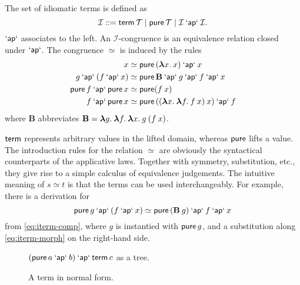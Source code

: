 \begin{definition}
The set of idiomatic terms is defined as
\begin{equation}
	\mathcal{I} ::= \operatorname{\mathsf{term}} \mathcal{T} \mid \operatorname{\mathsf{pure}} \mathcal{T} \mid
		\mathcal{I} \mathbin{\mathsf{`ap`}} \mathcal{I}.
\end{equation}
$\mathbin{\mathsf{`ap`}}$ associates to the left.
An $\mathcal{I}$-congruence is an equivalence relation closed under $\mathbin{\mathsf{`ap`}}$.
The congruence $\simeq$ is induced by the rules
\begin{align}
	x &\simeq \operatorname{\mathsf{pure}}{({\boldsymbol\lambda} x.\>x)} \mathbin{\mathsf{`ap`}} x \label{eq:iterm-id}\\
	g \mathbin{\mathsf{`ap`}} (f \mathbin{\mathsf{`ap`}} x) &\simeq \operatorname{\mathsf{pure}} \mathbf{B} \mathbin{\mathsf{`ap`}} g \mathbin{\mathsf{`ap`}} f \mathbin{\mathsf{`ap`}} x \label{eq:iterm-comp}\\
	\operatorname{\mathsf{pure}} f \mathbin{\mathsf{`ap`}} \operatorname{\mathsf{pure}} x &\simeq \operatorname{\mathsf{pure}} (f \> x) \label{eq:iterm-morph}\\
	f \mathbin{\mathsf{`ap`}} \operatorname{\mathsf{pure}} x &\simeq \operatorname{\mathsf{pure}}{(({\boldsymbol\lambda} x.\>{\boldsymbol\lambda} f.\>f \> x) \> x)} \mathbin{\mathsf{`ap`}} f \label{eq:iterm-xchng}
\end{align}
where $\mathbf{B}$ abbreviates
$\mathbf{B} = {\boldsymbol\lambda} g.\>{\boldsymbol\lambda} f.\>{\boldsymbol\lambda} x.\>g \> (f \> x)$.
\end{definition}

$\operatorname{\mathsf{term}}$ represents arbitrary values in the lifted domain, whereas $\operatorname{\mathsf{pure}}$
lifts a value.
The introduction rules for the relation $\simeq$ are obviously the syntactical
counterparts of the applicative laws.
Together with symmetry, substitution, etc., they give rise to a simple
calculus of equivalence judgements.
The intuitive meaning of $s \simeq t$ is that the terms can be used
interchangeably.
For example, there is a derivation for
\begin{equation}\label{eq:pure-rotate}
	\operatorname{\mathsf{pure}} g \mathbin{\mathsf{`ap`}} (f \mathbin{\mathsf{`ap`}} x) \simeq \operatorname{\mathsf{pure}}{(\mathbf{B} \> g)} \mathbin{\mathsf{`ap`}} f \mathbin{\mathsf{`ap`}} x
\end{equation}
from \eqref{eq:iterm-comp}, where $g$ is instantied with $\operatorname{\mathsf{pure}} g$, and a
substitution along \eqref{eq:iterm-morph} on the right-hand side.

\begin{figure}
\begin{minipage}[t]{0.46\textwidth}\centering
{}
\caption{$(\operatorname{\mathsf{pure}} a \mathbin{\mathsf{`ap`}} b) \mathbin{\mathsf{`ap`}} \operatorname{\mathsf{term}} c$ as a tree.}
\label{fig:iterm-ex}
\end{minipage}\hfill
\begin{minipage}[t]{0.46\textwidth}\centering
{}
\caption{A term in normal form.}
\label{fig:iterm-nf-ex}
\end{minipage}
\end{figure}

